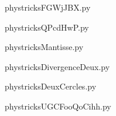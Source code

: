     \newcommand{\CaptionFigFGWjJBX}{<+Type your caption here+>}
    \begin{center}
        
    \end{center}
    phystricksFGWjJBX.py

    

    \clearpage
    


    \newcommand{\CaptionFigQPcdHwP}{<+Type your caption here+>}
    \begin{center}
        
    \end{center}
    phystricksQPcdHwP.py

    

    \clearpage
    


    \newcommand{\CaptionFigMantisse}{<+Type your caption here+>}
    \begin{center}
        
    \end{center}
    phystricksMantisse.py

    

    \clearpage
    


    \newcommand{\CaptionFigDivergenceDeux}{<+Type your caption here+>}
    \begin{center}
        
    \end{center}
    phystricksDivergenceDeux.py

    

    \clearpage
    


    \newcommand{\CaptionFigDeuxCercles}{<+Type your caption here+>}
    \begin{center}
        
    \end{center}
    phystricksDeuxCercles.py

    

    \clearpage
    


    \newcommand{\CaptionFigUGCFooQoCihh}{<+Type your caption here+>}
    \begin{center}
        
    \end{center}
    phystricksUGCFooQoCihh.py

